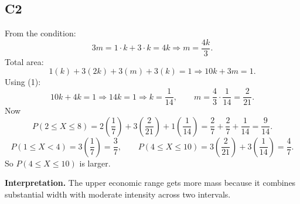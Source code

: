 \subsection*{C2}
From the condition:
\[
3m=1\cdot k+3\cdot k=4k
\Rightarrow m=\frac{4k}{3}. \tag{1}
\]
Total area:
\[
1(k)+3(2k)+3(m)+3(k)=1
\Rightarrow 10k+3m=1.
\]
Using (1):
\[
10k+4k=1 \Rightarrow 14k=1 \Rightarrow k=\frac{1}{14},
\qquad
m=\frac{4}{3}\cdot\frac{1}{14}=\frac{2}{21}.
\]
Now
\[
P(2\le X\le 8)=2\left(\frac{1}{7}\right)+3\left(\frac{2}{21}\right)+1\left(\frac{1}{14}\right)
=\frac{2}{7}+\frac{2}{7}+\frac{1}{14}=\frac{9}{14}.
\]
\[
P(1\le X<4)=3\left(\frac{1}{7}\right)=\frac{3}{7},
\qquad
P(4\le X\le 10)=3\left(\frac{2}{21}\right)+3\left(\frac{1}{14}\right)=\frac{4}{7}.
\]
So $P(4\le X\le 10)$ is larger.

\textbf{Interpretation.}
The upper economic range gets more mass because it combines substantial width with moderate intensity across two intervals.


